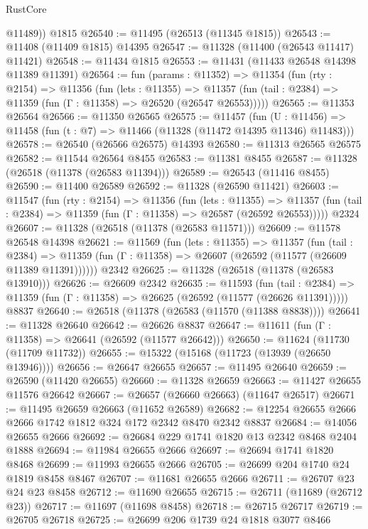 \begin{lexlean}{RustCore}
\begin{coremodule}
        @11489))
    @1815
@26540 := @11495 (@26513 (@11345 @1815))
@26543 := @11408 (@11409 @1815) @14395
@26547 := @11328 (@11400 (@26543 @11417) @11421)
@26548 := @11434 @1815
@26553 := @11431 (@11433 @26548 @14398 @11389 @11391)
@26564 := fun (params : @11352) =>
  @11354
    (fun (rty : @2154) =>
    @11356
      (fun (lets : @11355) =>
      @11357 (fun (tail : @2384) => @11359 (fun (Γ : @11358) => @26520 (@26547 @26553)))))
@26565 := @11353 @26564
@26566 := @11350 @26565
@26575 := @11457
    (fun (U : @11456) => @11458 (fun (t : @7) => @11466 (@11328 (@11472 @14395 @11346) @11483)))
@26578 := @26540 (@26566 @26575) @14393
@26580 := @11313 @26565 @26575
@26582 := @11544 @26564 @8455
@26583 := @11381 @8455
@26587 := @11328 (@26518 (@11378 (@26583 @11394)))
@26589 := @26543 (@11416 @8455)
@26590 := @11400 @26589
@26592 := @11328 (@26590 @11421)
@26603 := @11547
    (fun (rty : @2154) =>
    @11356
      (fun (lets : @11355) =>
      @11357 (fun (tail : @2384) => @11359 (fun (Γ : @11358) => @26587 (@26592 @26553)))))
    @2324
@26607 := @11328 (@26518 (@11378 (@26583 @11571)))
@26609 := @11578 @26548 @14398
@26621 := @11569
    (fun (lets : @11355) =>
    @11357
      (fun (tail : @2384) =>
      @11359 (fun (Γ : @11358) => @26607 (@26592 (@11577 (@26609 @11389 @11391))))))
    @2342
@26625 := @11328 (@26518 (@11378 (@26583 @13910)))
@26626 := @26609 @2342
@26635 := @11593
    (fun (tail : @2384) => @11359 (fun (Γ : @11358) => @26625 (@26592 (@11577 (@26626 @11391)))))
    @8837
@26640 := @26518 (@11378 (@26583 (@11570 (@11388 @8838))))
@26641 := @11328 @26640
@26642 := @26626 @8837
@26647 := @11611 (fun (Γ : @11358) => @26641 (@26592 (@11577 @26642)))
@26650 := @11624 (@11730 (@11709 @11732))
@26655 := @15322 (@15168 (@11723 (@13939 (@26650 @13946))))
@26656 := @26647 @26655
@26657 := @11495 @26640
@26659 := @26590 (@11420 @26655)
@26660 := @11328 @26659
@26663 := @11427 @26655 @11576 @26642
@26667 := @26657 (@26660 @26663) (@11647 @26517)
@26671 := @11495 @26659 @26663 (@11652 @26589)
@26682 := @12254 @26655 @2666 @2666 @1742 @1812 @324 @172 @2342 @8470 @2342 @8837
@26684 := @14056 @26655 @2666
@26692 := @26684 @229 @1741 @1820 @13 @2342 @8468 @2404 @1888
@26694 := @11984 @26655 @2666
@26697 := @26694 @1741 @1820 @8468
@26699 := @11993 @26655 @2666
@26705 := @26699 @204 @1740 @24 @1819 @8458 @8467
@26707 := @11681 @26655 @2666
@26711 := @26707 @23 @24 @23 @8458
@26712 := @11690 @26655
@26715 := @26711 (@11689 (@26712 @23))
@26717 := @11697 (@11698 @8458)
@26718 := @26715 @26717
@26719 := @26705 @26718
@26725 := @26699 @206 @1739 @24 @1818 @3077 @8466

\end{coremodule}
\end{lexlean}
